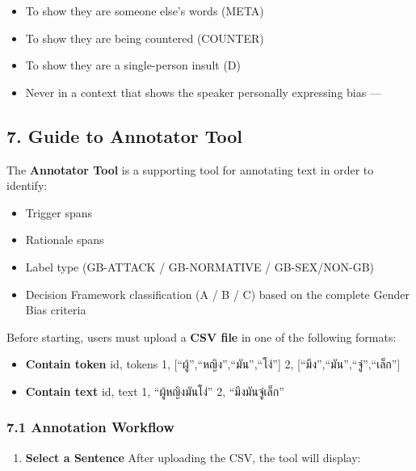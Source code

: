 \documentclass[12pt,oneside,openright,a4paper]{cpe-english-project}
\begin{document}
\begin{itemize}
\setlength{\itemsep}{0.15\baselineskip}
\setlength{\parsep}{0pt}
\setlength{\parskip}{0pt}
\item
  To show they are someone else's words (META)
\item
  To show they are being countered (COUNTER)
\item
  To show they are a single-person insult (D)
\item
  Never in a context that shows the speaker personally expressing bias
  ---
\end{itemize}

\subsection{7. Guide to Annotator Tool}\label{guide-to-annotator-tool}

The \textbf{Annotator Tool} is a supporting tool for annotating text in
order to identify:

\begin{itemize}
\setlength{\itemsep}{0.15\baselineskip}
\setlength{\parsep}{0pt}
\setlength{\parskip}{0pt}
\item
  Trigger spans
\item
  Rationale spans
\item
  Label type (GB-ATTACK / GB-NORMATIVE / GB-SEX/NON-GB)
\item
  Decision Framework classification (A / B / C) based on the complete
  Gender Bias criteria
\end{itemize}

Before starting, users must upload a \textbf{CSV file} in one of the
following formats:

\begin{itemize}
\setlength{\itemsep}{0.15\baselineskip}
\setlength{\parsep}{0pt}
\setlength{\parskip}{0pt}
\item
  \textbf{Contain token}
  id, tokens
  1, {[}``ผู้'',``หญิง'',``มัน'',``โง่''{]}
  2, {[}``มึง'',``มัน'',``จู๋'',``เล็ก''{]}
\item
  \textbf{Contain text}
  id, text
  1, ``ผู้หญิงมันโง่''
  2, ``มึงมันจู๋เล็ก''
\end{itemize}

\subsubsection{7.1 Annotation Workflow}\label{annotation-workflow}

\begin{enumerate}
\setlength{\itemsep}{0.15\baselineskip}
\setlength{\parsep}{0pt}
\setlength{\parskip}{0pt}
\def\labelenumi{\arabic{enumi})}
\item
  \textbf{Select a Sentence}
  After uploading the CSV, the tool will display:
\end{enumerate}
\end{document}
